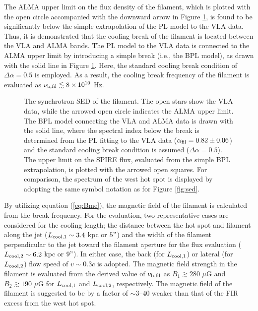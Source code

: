 \documentclass[twocolumn]{aastex631}
\begin{document}
The ALMA upper limit on the flux density of the filament,
which is plotted with the open circle 
accompanied with the downward arrow in Figure \ref{fig:sed_fil},
is found to be significantly below the simple extrapolation of 
the PL model to the VLA data.
Thus, it is demonstrated that the cooling break of the filament 
is located between the VLA and ALMA bands.
The PL model to the VLA data is connected to the ALMA upper limit
by introducing a simple break (i.e., the BPL model), 
as drawn with the solid line in Figure \ref{fig:sed_fil}.
Here, the standard cooling break condition 
of $\Delta \alpha = 0.5$ is employed. 
As a result, the cooling break frequency of the filament is 
evaluated as $\nu_{\rm b, fil} \lesssim 8 \times 10^{10}$ Hz.


\begin{figure}[t]
    \caption{
    The synchrotron SED of the filament.
    The open stars show the VLA data, 
    while the arrowed open circle indicates the ALMA upper limit.
    The BPL model connecting the VLA and ALMA data is 
    drawn with the solid line,
    where the spectral index below the break is determined 
    from the PL fitting to the VLA data 
    ($\alpha_{\rm fil} = 0.82 \pm 0.06$)
    and the standard cooling break condition is assumed 
    ($\Delta \alpha = 0.5$).
    The upper limit on the SPIRE flux, 
    evaluated from the simple BPL extrapolation,
    is plotted with the arrowed open squares.  
    For comparison, the spectrum of the west hot spot is 
    displayed by adopting the same symbol notation
    as for Figure \ref{fig:sed}.}
    \label{fig:sed_fil}
\end{figure}



By utilizing equation (\ref{eq:Bme}),
the magnetic field of the filament is calculated 
from the break frequency.
For the evaluation, 
two representative cases are considered for the cooling length;
the distance between the hot spot and filament along the jet 
($L_{\rm cool,1}\sim3.4$ kpc or $5"$)
and 
the width of the filament perpendicular to the jet 
toward the filament aperture for the flux evaluation 
($L_{\rm cool,2}\sim6.2$ kpc or $9"$).
In either case, the back (for $L_{\rm cool,1}$) or lateral (for $L_{\rm cool,2}$)
flow speed of $v\sim0.3c$ \citep{perley1997,kino2004} is adopted. 
The magnetic field strength in the filament is evaluated 
from the derived value of $\nu_{\rm b,fil}$ as 
$B_1 \gtrsim 280$ $\mu$G and $ B_2 \gtrsim 190$ $\mu$G
for $L_{\rm cool,1}$ and $L_{\rm cool,2}$, respectively.
The magnetic field of the filament is suggested to be 
by a factor of $\sim 3$--$40$ weaker 
than that of the FIR excess from the west hot spot.
\end{document}
